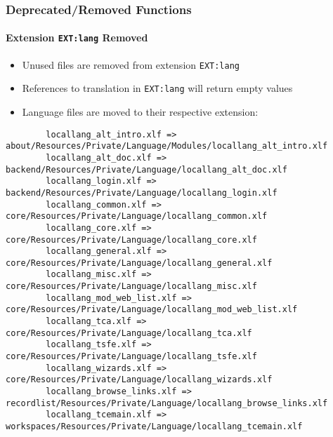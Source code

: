 
\begin{frame}[fragile]
	\frametitle{Deprecated/Removed Functions}
	\framesubtitle{Extension \texttt{EXT:lang} Removed}

	\lstset{basicstyle=\tiny\ttfamily}

	\begin{itemize}
		\item Unused files are removed from extension \texttt{EXT:lang}
		\item References to translation in \texttt{EXT:lang} will return empty values
		\item Language files are moved to their respective extension:
	\end{itemize}

	\begin{lstlisting}
		locallang_alt_intro.xlf => about/Resources/Private/Language/Modules/locallang_alt_intro.xlf
		locallang_alt_doc.xlf => backend/Resources/Private/Language/locallang_alt_doc.xlf
		locallang_login.xlf => backend/Resources/Private/Language/locallang_login.xlf
		locallang_common.xlf => core/Resources/Private/Language/locallang_common.xlf
		locallang_core.xlf => core/Resources/Private/Language/locallang_core.xlf
		locallang_general.xlf => core/Resources/Private/Language/locallang_general.xlf
		locallang_misc.xlf => core/Resources/Private/Language/locallang_misc.xlf
		locallang_mod_web_list.xlf => core/Resources/Private/Language/locallang_mod_web_list.xlf
		locallang_tca.xlf => core/Resources/Private/Language/locallang_tca.xlf
		locallang_tsfe.xlf => core/Resources/Private/Language/locallang_tsfe.xlf
		locallang_wizards.xlf => core/Resources/Private/Language/locallang_wizards.xlf
		locallang_browse_links.xlf => recordlist/Resources/Private/Language/locallang_browse_links.xlf
		locallang_tcemain.xlf => workspaces/Resources/Private/Language/locallang_tcemain.xlf
	\end{lstlisting}

\end{frame}

